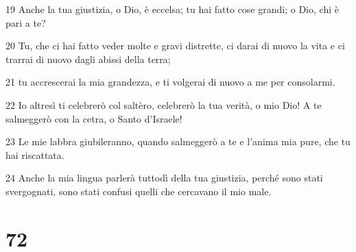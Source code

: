 \par 19 Anche la tua giustizia, o Dio, è eccelsa; tu hai fatto cose grandi; o Dio, chi è pari a te?
\par 20 Tu, che ci hai fatto veder molte e gravi distrette, ci darai di nuovo la vita e ci trarrai di nuovo dagli abissi della terra;
\par 21 tu accrescerai la mia grandezza, e ti volgerai di nuovo a me per consolarmi.
\par 22 Io altresì ti celebrerò col saltèro, celebrerò la tua verità, o mio Dio! A te salmeggerò con la cetra, o Santo d'Israele!
\par 23 Le mie labbra giubileranno, quando salmeggerò a te e l'anima mia pure, che tu hai riscattata.
\par 24 Anche la mia lingua parlerà tuttodì della tua giustizia, perché sono stati svergognati, sono stati confusi quelli che cercavano il mio male.

\chapter{72}

